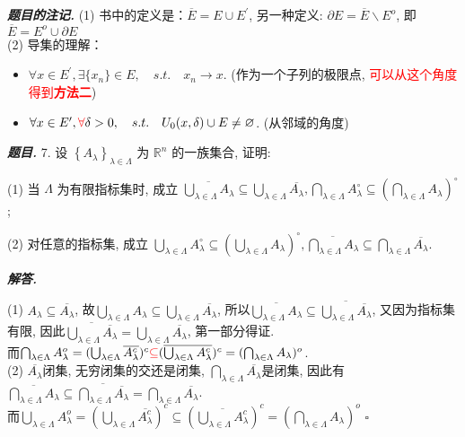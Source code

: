 \documentclass[10pt, a4paper, oneside]{ctexart}
\newenvironment{problem}{\begin{framed}\par\noindent\textbf{\textit{题目. }}}{\end{framed}\par}
\newenvironment{solution}{%
  \par\noindent\textbf{\textit{解答. }}\ignorespaces
}{%
  \hfill\ensuremath{\square}\par %
}
\newenvironment{note}{\par\noindent\textbf{\textit{题目的注记. }}\ignorespaces}{\par}
\begin{document}
\begin{note}
    (1) 书中的定义是：$\overline{E}=E\cup E^{\prime}$, 另一种定义: $\partial E=\overline{E}\backslash E^{o}$, 即$\overline{E}=E^{o}\cup \partial E$\\
    (2) 导集的理解：
    \begin{itemize}
        \item $\forall x\in E^{\prime}, \exists \{x_n\}\in E, \quad s.t. \quad x_n \to x$. (作为一个子列的极限点, \textcolor{red}{可以从这个角度得到\textbf{\textcolor{red}{方法二}}})
        \item $\forall x\in E^{\prime}, \textcolor{red}{\forall} \delta>0, \quad s.t. \quad U_0(x,\delta)\cup E\neq \varnothing$. (从邻域的角度)
    \end{itemize}
\end{note}

\begin{problem}
7. 设 $\left\{A_\lambda\right\}_{\lambda \in \Lambda}$ 为 $\mathbb{R}^n$ 的一族集合, 证明:

(1) 当 $\Lambda$ 为有限指标集时, 成立 $\overline{\bigcup_{\lambda \in \Lambda} A_\lambda} \subseteq \bigcup_{\lambda \in \Lambda} \overline{A_\lambda}, \bigcap_{\lambda \in \Lambda} A_\lambda^{\circ} \subseteq\left(\bigcap_{\lambda \in \Lambda} A_\lambda\right)^{\circ}$;

(2) 对任意的指标集, 成立 $\bigcup_{\lambda \in \Lambda} A_\lambda^{\circ} \subseteq\left(\bigcup_{\lambda \in \Lambda} A_\lambda\right)^{\circ}, \overline{\bigcap_{\lambda \in \Lambda} A_\lambda} \subseteq \bigcap_{\lambda \in \Lambda} \overline{A_\lambda}$.
\end{problem}

\begin{solution}
(1) $A_{\lambda}\subseteq \overline{A_{\lambda}}$, 故$\bigcup_{\lambda\in \Lambda} A_{\lambda}\subseteq \bigcup_{\lambda\in \Lambda}\overline{A_{\lambda}}$, 所以$\overline{\bigcup_{\lambda\in \Lambda} A_{\lambda}}\subseteq \overline{\bigcup_{\lambda\in \Lambda}\overline{A_{\lambda}}}$, 又因为指标集有限, 因此$\overline{\bigcup_{\lambda\in \Lambda}\overline{A_{\lambda}}}=\bigcup_{\lambda\in \Lambda}\overline{A_{\lambda}}$, 第一部分得证.\\
而$\bigcap_{\lambda \in \Lambda}A_{\lambda}^{o}=(\bigcup_{\lambda\in \Lambda} \overline{A_{\lambda}^{c}})^{c}\textcolor{red}{\subseteq}(\overline{\bigcup_{\lambda\in \Lambda} A_{\lambda}^{c}})^{c}=(\bigcap_{\lambda\in \Lambda}A_{\lambda})^{o}$.\\
(2) $\overline{A_{\lambda}}$闭集, 无穷闭集的交还是闭集, $\bigcap_{\lambda\in \Lambda}\overline{A_{\lambda}}$是闭集, 因此有$\overline{\bigcap_{\lambda\in \Lambda}A_{\lambda}}\subseteq \overline{\bigcap_{\lambda\in \Lambda}\overline{A_{\lambda}}}=\bigcap_{\lambda\in \Lambda}\overline{A_{\lambda}}$.\\
而$\bigcup_{\lambda\in \Lambda}A_{\lambda}^{o}=(\bigcup_{\lambda\in \Lambda}\overline{A^c_{\lambda}})^{c}\subseteq (\overline{\bigcup_{\lambda\in \Lambda}A_{\lambda}^c})^c=(\bigcap_{\lambda\in \Lambda}A_{\lambda})^{o}$
\end{solution}
\end{document}
